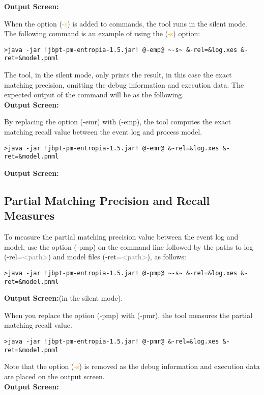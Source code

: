 \documentclass{article}
\begin{document}
\textbf{Output Screen:}%


When the option (\textcolor{orange}{\footnotesize\ttfamily-s}) is added to commands, the tool runs in the silent mode. The following command is an example of using the (\textcolor{orange}{\footnotesize\ttfamily-s}) option:
\begin{lstlisting}[style=CL]
>java -jar !jbpt-pm-entropia-1.5.jar! @-emp@ ~-s~ &-rel=&log.xes &-ret=&model.pnml
\end{lstlisting}
The tool, in the silent mode, only prints the result, in this case the exact matching precision, omitting the debug information and execution data. The expected output of the command will be as the following. \\
\textbf{Output Screen:}%


By replacing the option (\textcolor{darkcandyapplered}{\footnotesize\ttfamily-emr}) with (\textcolor{darkcandyapplered}{\footnotesize\ttfamily-emp}), the tool computes the exact matching recall value between the event log and process model. 

\begin{lstlisting}[style=CL]
>java -jar !jbpt-pm-entropia-1.5.jar! @-emr@ &-rel=&log.xes &-ret=&model.pnml
\end{lstlisting}
\textbf{Output Screen:}%


\subsection{Partial Matching Precision and Recall Measures}
To measure the partial matching precision value between the event log and model, use the option (\textcolor{darkcandyapplered}{\footnotesize\ttfamily-pmp}) on the command line followed by the paths to log (\textcolor{ao}{\footnotesize\ttfamily-rel=}\textcolor{gray}{\footnotesize\ttfamily<path>}) and model files (\textcolor{ao}{\footnotesize\ttfamily-ret=}\textcolor{gray}{\footnotesize\ttfamily<path>}), as follows: 
\begin{lstlisting}[style=CL]
>java -jar !jbpt-pm-entropia-1.5.jar! @-pmp@ ~-s~ &-rel=&log.xes &-ret=&model.pnml
\end{lstlisting}
\textbf{Output Screen:}(in the silent mode).

When you replace the option (\textcolor{darkcandyapplered}{\footnotesize\ttfamily-pmp}) with (\textcolor{darkcandyapplered}{\footnotesize\ttfamily-pmr}), the tool measures the partial matching recall value.
\begin{lstlisting}[style=CL]
>java -jar !jbpt-pm-entropia-1.5.jar! @-pmr@ &-rel=&log.xes &-ret=&model.pnml
\end{lstlisting}
Note that the option (\textcolor{orange}{\footnotesize\ttfamily-s}) is removed as the debug information and execution data are placed on the output screen. \\
\textbf{Output Screen:}

\end{document}
